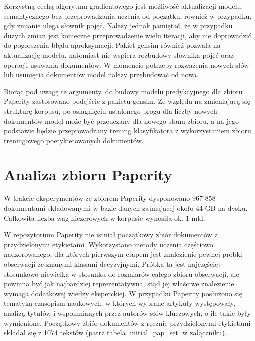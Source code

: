 \documentclass{pracamgr}
\begin{document}
Korzystną cechą algorytmu gradientowego jest możliwość aktualizacji modelu semantycznego bez przeprowadzania uczenia od początku, również w przypadku, gdy zmianie ulega słownik pojęć. Należy jednak pamiętać, że w przypadku dużych zmian jest konieczne przeprowadzenie wielu iteracji, aby nie doprowadzić do pogorszenia błędu aproksymacji. Pakiet gensim również pozwala na aktualizację modelu, natomiast nie wspiera rozbudowy słownika pojęć oraz operacji usuwania dokumentów. W momencie potrzeby rozważenia nowych słów lub usunięcia dokumentów model należy przebudować od nowa.

Biorąc pod uwagę te argumenty, do budowy modelu predykcyjnego dla zbioru Paperity zastosowano podejście z pakietu gensim. Ze względu na zmieniającą się strukturę korpusu, po osiągnięciu ustalonego progu dla liczby nowych dokumentów model może być przeuczany dla nowego stanu zbioru, a na jego podstawie będzie przeprowadzany trening klasyfikatora z wykorzystaniem zbioru treningowego poetykietowanych dokumentów.

\section{Analiza zbioru Paperity}

W trakcie eksperymentów ze zbiorem Paperity dysponowano 967 858 dokumentami składowanymi w bazie danych zajmującej około 44 GB na dysku. Całkowita liczba wag niezerowych w korpusie wynosiła ok. 1 mld.

W repozytorium Paperity nie istniał początkowy zbiór dokumentów z przydzielonymi etykietami. Wykorzystano metody uczenia częściowo nadzorowanego, dla których pierwszym etapem jest znalezienie pewnej próbki obserwacji ze znanymi klasami decyzyjnymi. Próbka ta jest najczęściej stosunkowo niewielka w stosunku do rozmiarów całego zbioru obserwacji, ale powinna być jak najbardziej reprezentatywna, stąd jej właściwe znalezienie wymaga dodatkowej wiedzy eksperckiej. W przypadku Paperity posłużono się tematyką czasopism naukowych, w których wybrane artykuły występowały, analizą tytułów i wspomnianych przez autorów słów kluczowych, o ile takie były wymienione. Początkowy zbiór dokumentów z ręcznie przydzielonymi etykietami składał się z 1074 tekstów (patrz tabela \ref{initial_pap_set} w załączniku). 
\end{document}

